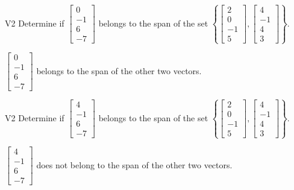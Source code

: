 \begin{problem}{V2}
  Determine if
  \(\begin{bmatrix} 0 \\ -1 \\ 6 \\ -7 \end{bmatrix}\)
  belongs to the span of the set
  \(\left\{
    \begin{bmatrix} 2 \\ 0 \\ -1 \\ 5 \end{bmatrix},
    \begin{bmatrix} 4 \\ -1 \\ 4 \\ 3 \end{bmatrix}
    \right\}
  \).
\end{problem}
\begin{solution}
  \(\begin{bmatrix} 0 \\ -1 \\ 6 \\ -7 \end{bmatrix}\) belongs to the span of the other  two vectors.
\end{solution}


\begin{problem}{V2}
  Determine if
  \(\begin{bmatrix} 4 \\ -1 \\ 6 \\ -7 \end{bmatrix}\)
  belongs to the span of the set
  \(\left\{
    \begin{bmatrix} 2 \\ 0 \\ -1 \\ 5 \end{bmatrix},
    \begin{bmatrix} 4 \\ -1 \\ 4 \\ 3 \end{bmatrix}
    \right\}
  \).
\end{problem}
\begin{solution}
  \(\begin{bmatrix} 4 \\ -1 \\ 6 \\ -7 \end{bmatrix}\) does not belong to the span of the other two vectors.
\end{solution}


